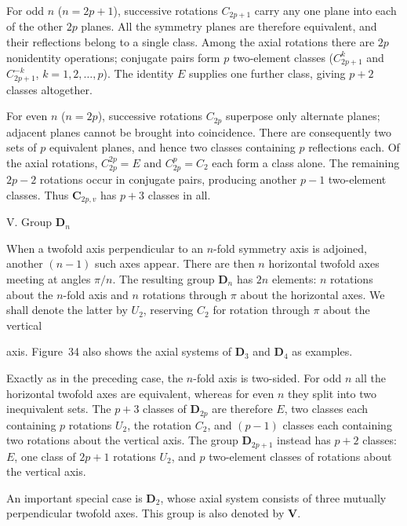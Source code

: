 \begin{figure}[ht]
\begin{tikzpicture}[scale=.72,line width=.4pt]
\end{tikzpicture}
\caption{}
\label{fig:93-34}
\end{figure}

For odd $n$ ($n=2p+1$), successive rotations $C_{2p+1}$ carry any one plane into each of the other $2p$ planes. All the symmetry planes are therefore equivalent, and their reflections belong to a single class. Among the axial rotations there are $2p$ nonidentity operations; conjugate pairs form $p$ two-element classes ($C_{2p+1}^k$ and $C_{2p+1}^{-k}$, $k=1,2,\ldots,p$). The identity $E$ supplies one further class, giving $p+2$ classes altogether.

For even $n$ ($n=2p$), successive rotations $C_{2p}$ superpose only alternate planes; adjacent planes cannot be brought into coincidence. There are consequently two sets of $p$ equivalent planes, and hence two classes containing $p$ reflections each. Of the axial rotations, $C_{2p}^{2p}=E$ and $C_{2p}^p=C_2$ each form a class alone. The remaining $2p-2$ rotations occur in conjugate pairs, producing another $p-1$ two-element classes. Thus $\boldsymbol{C}_{2p,v}$ has $p+3$ classes in all.

\medskip
\noindent V. Group $\boldsymbol{D}_n$

When a twofold axis perpendicular to an $n$-fold symmetry axis is adjoined, another $(n-1)$ such axes appear. There are then $n$ horizontal twofold axes meeting at angles $\pi/n$. The resulting group $\boldsymbol{D}_n$ has $2n$ elements: $n$ rotations about the $n$-fold axis and $n$ rotations through $\pi$ about the horizontal axes. We shall denote the latter by $U_2$, reserving $C_2$ for rotation through $\pi$ about the vertical

axis. Figure~34 also shows the axial systems of $\boldsymbol{D}_3$ and $\boldsymbol{D}_4$ as examples.

Exactly as in the preceding case, the $n$-fold axis is two-sided. For odd $n$ all the horizontal twofold axes are equivalent, whereas for even $n$ they split into two inequivalent sets. The $p+3$ classes of $\boldsymbol{D}_{2p}$ are therefore $E$, two classes each containing $p$ rotations $U_2$, the rotation $C_2$, and $(p-1)$ classes each containing two rotations about the vertical axis. The group $\boldsymbol{D}_{2p+1}$ instead has $p+2$ classes: $E$, one class of $2p+1$ rotations $U_2$, and $p$ two-element classes of rotations about the vertical axis.

An important special case is $\boldsymbol{D}_2$, whose axial system consists of three mutually perpendicular twofold axes. This group is also denoted by $\boldsymbol{V}$.

